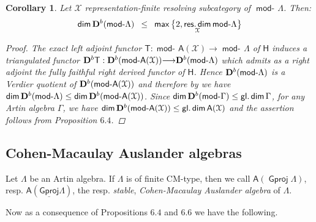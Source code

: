 \documentclass[oneside, a4paper,reqno]{amsart}
\numberwithin{equation}{section}
\newtheorem{cor}[thm]{Corollary}
\theoremstyle{definition}
\begin{document}
\begin{cor} Let ${\mathcal X}$ representation-finite resolving
subcategory of $\operatorname*{\mathsf{mod}-\!}\Lambda$.  Then:
\[
\operatorname*{\mathsf{dim}}{\bf D}^{b}(\operatorname*{\mathsf{mod}-\!}\Lambda)\,\ \leq \,\
\operatorname*{\mathsf{max}}\big\{2,\operatorname*{\mathsf{res.dim}}_{\mathcal X}\operatorname*{\mathsf{mod}-\!}\Lambda\big\}
\]
\begin{proof} The exact left adjoint functor $\mathsf{T} :
\operatorname*{\mathsf{mod}-\!}\mathsf{A}({\mathcal X}) {\longrightarrow} \operatorname*{\mathsf{mod}-\!}\Lambda$ of $\mathsf{H}$ induces a
triangulated functor ${\bf D}^{b}\mathsf{T} : {\bf
D}^{b}(\operatorname*{\mathsf{mod}-\!}\mathsf{A}({\mathcal X})) {\longrightarrow} {\bf D}^{b}(\operatorname*{\mathsf{mod}-\!}\Lambda)$ which
admits as a right adjoint the fully faithful right derived functor of
$\mathsf{H}$. Hence ${\bf D}^{b}(\operatorname*{\mathsf{mod}-\!}\Lambda)$ is a Verdier
quotient of ${\bf D}^{b}(\operatorname*{\mathsf{mod}-\!}\mathsf{A}({\mathcal X}))$ and therefore by
\cite{Rouquier:Kth} we have $\operatorname*{\mathsf{dim}}{\bf D}^{b}(\operatorname*{\mathsf{mod}-\!}\Lambda) \leq
\operatorname*{\mathsf{dim}}{\bf D}^{b}(\operatorname*{\mathsf{mod}-\!}\mathsf{A}({\mathcal X}))$. Since $\operatorname*{\mathsf{dim}}{\bf
D}^{b}(\operatorname*{\mathsf{mod}-\!}\Gamma) \leq \operatorname*{\mathsf{gl.dim}}\Gamma$, for any Artin algebra $\Gamma$,
we have  $\operatorname*{\mathsf{dim}}{\bf D}^{b}(\operatorname*{\mathsf{mod}-\!}\mathsf{A}({\mathcal X})) \leq
\operatorname*{\mathsf{gl.dim}}\mathsf{A}({\mathcal X})$ and the assertion follows from Proposition $6.4$.
\end{proof}
\end{cor}

\subsection{Cohen-Macaulay Auslander algebras} Let $\Lambda$ be an Artin algebra.
If $\Lambda$ is of finite CM-type, then we call
$\mathsf{A}({\operatorname{\mathsf{Gproj}}\nolimits}\Lambda)$, resp. $\mathsf{A}({\operatorname{\underline{\mathsf{Gproj}}}\nolimits}\Lambda)$, the
resp. {\em stable}, {\em Cohen-Macaulay Auslander algebra} of
$\Lambda$.

Now as a consequence of Propositions $6.4$ and $6.6$ we have the
following.
\end{document}
